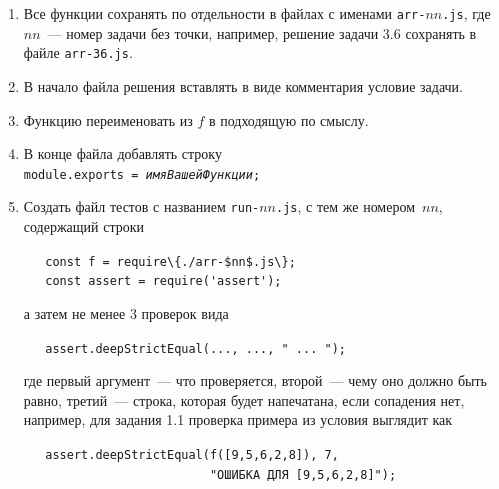 \documentclass{article}
\begin{document}
\medskip

\begin{enumerate}[nolistsep]
    \item
    Все функции сохранять по отдельности в файлах с именами \texttt{arr-$nn$.js}, где $nn$~--- номер задачи без точки, например, решение задачи 3.6 сохранять в файле \texttt{arr-36.js}.
    \item
    В начало файла решения вставлять в виде комментария условие задачи. 
    \item
    Функцию переименовать из $f$ в подходящую по смыслу. 
    \item
    В конце файла добавлять строку
    \\[.7mm]
    \texttt{module.exports = \textit{имяВашейФункции};}
    \item
    Создать файл тестов с названием \texttt{run-$nn$.js}, с тем же номером~$nn$, содержащий строки

    \smallskip
    \verb!   const f = require\{./arr-$nn$.js\};!\\
    \verb!   const assert = require('assert');!

    \smallskip
    \noindent
    а затем не менее 3 проверок вида 
    
    \smallskip
    \verb!   assert.deepStrictEqual(..., ..., " ... ");!

    \smallskip
    \noindent
    где первый аргумент~--- что проверяется, второй~--- чему оно должно быть равно,
    третий~--- строка, которая будет напечатана, если сопадения нет, например, для задания 1.1
    проверка примера из условия выглядит как

    \smallskip
    \verb!   assert.deepStrictEqual(f([9,5,6,2,8]), 7,!\\
    \verb!                          "ОШИБКА ДЛЯ [9,5,6,2,8]");!

\end{enumerate}
\end{document}
